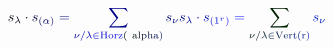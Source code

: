 \documentclass[12pt]{article}
\begin{document}
\makeatletter
\renewcommand*{\@textcolor}[3]{%
  \protect\leavevmode
  \begingroup
    \color#1{#2}#3%
  \endgroup
}
\makeatother
\begin{displaymath}
\mathcolor[RGB]{0,0,15}{s} _ { \mathcolor[RGB]{0,0,30}{\lambda} } \mathcolor[RGB]{0,0,45}{\cdot} \mathcolor[RGB]{0,0,60}{s} _ { \mathcolor[RGB]{0,0,75}{(} \mathcolor[RGB]{0,0,90}{\alpha} \mathcolor[RGB]{0,0,105}{)} } \mathcolor[RGB]{0,0,120}{=} \mathcolor[RGB]{0,0,135}{\sum} _ { \mathcolor[RGB]{0,0,150}{\nu} \mathcolor[RGB]{0,0,165}{/} \mathcolor[RGB]{0,0,180}{\lambda} \mathcolor[RGB]{0,0,195}{\in} \mathrm { \mathcolor[RGB]{0,0,210}{H} \mathcolor[RGB]{0,0,225}{o} \mathcolor[RGB]{0,0,240}{r} \mathcolor[RGB]{0,0,255}{z} \mathcolor[RGB]{0,15,0}{(} \ \mathcolor[RGB]{0,15,15}{a} \mathcolor[RGB]{0,15,30}{l} \mathcolor[RGB]{0,15,45}{p} \mathcolor[RGB]{0,15,60}{h} \mathcolor[RGB]{0,15,75}{a} \mathcolor[RGB]{0,15,90}{)} } } \mathcolor[RGB]{0,15,105}{s} _ { \mathcolor[RGB]{0,15,120}{\nu} } \mathcolor[RGB]{0,15,135}{s} _ { \mathcolor[RGB]{0,15,150}{\lambda} } \mathcolor[RGB]{0,15,165}{\cdot} \mathcolor[RGB]{0,15,180}{s} _ { \mathcolor[RGB]{0,15,195}{(} \mathcolor[RGB]{0,15,210}{1} ^ { \mathcolor[RGB]{0,15,225}{r} } \mathcolor[RGB]{0,15,240}{)} } \mathcolor[RGB]{0,15,255}{=} \mathcolor[RGB]{0,30,0}{\sum} _ { \mathcolor[RGB]{0,30,15}{\nu} \mathcolor[RGB]{0,30,30}{/} \mathcolor[RGB]{0,30,45}{\lambda} \mathcolor[RGB]{0,30,60}{\in} \mathrm { \mathcolor[RGB]{0,30,75}{V} \mathcolor[RGB]{0,30,90}{e} \mathcolor[RGB]{0,30,105}{r} \mathcolor[RGB]{0,30,120}{t} \mathcolor[RGB]{0,30,135}{(} \mathcolor[RGB]{0,30,150}{r} \mathcolor[RGB]{0,30,165}{)} } } \mathcolor[RGB]{0,30,180}{s} _ { \mathcolor[RGB]{0,30,195}{\nu} }
\end{displaymath}
\end{document}
